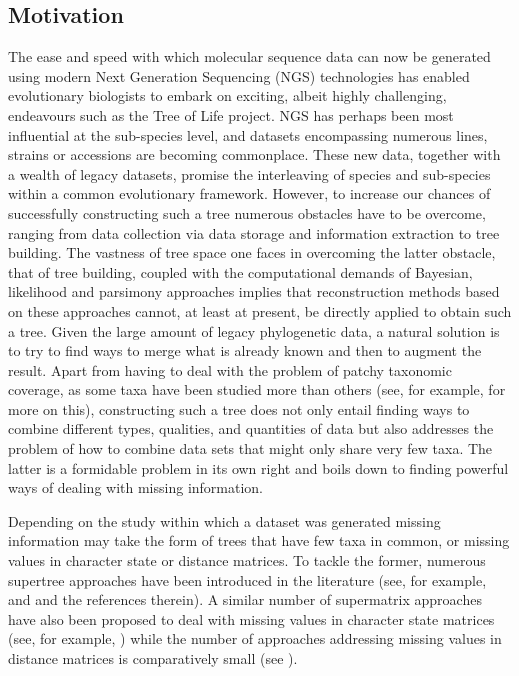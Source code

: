 \subsection{Motivation}
\label{sec:lasso-motivation}

The ease and speed with which molecular sequence data can now be generated
using modern Next Generation Sequencing (NGS) technologies has enabled
evolutionary biologists to embark on exciting, albeit highly challenging,
endeavours such as the Tree of Life project. NGS has perhaps been most
influential at the sub-species level, and datasets encompassing numerous
lines, strains or accessions are becoming commonplace. These new data,
together with a wealth of legacy datasets, promise the interleaving of species
and sub-species within a common evolutionary framework.  However, to increase
our chances of successfully constructing such a tree numerous obstacles have
to be overcome, ranging from data collection via data storage and information
extraction to tree building. The vastness of tree space one faces in
overcoming the latter obstacle, that of tree building, coupled with the
computational demands of Bayesian, likelihood and parsimony approaches implies
that reconstruction methods based on these approaches cannot, at least at
present, be directly applied to obtain such a tree. Given the large amount of
legacy phylogenetic data, a natural solution is to try to find ways to merge
what is already known and then to augment the result. Apart from having to
deal with the problem of patchy taxonomic coverage, as some taxa have been
studied more than others (see, for example,
\cite{sanderson10phylogenomics,philippe2004phylogenomics,steel10characterizing,roure12impact}
for more on this), constructing such a tree does not only entail finding ways
to combine different types, qualities, and quantities of data but also
addresses the problem of how to combine data sets that might only share very
few taxa. The latter is a formidable problem in its own right and boils down
to finding powerful ways of dealing with missing information.

Depending on the study within which a dataset was generated missing
information may take the form of trees that have few taxa in common, or
missing values in character state or distance matrices.  To tackle the former,
numerous supertree approaches have been introduced in the literature (see, for
example, \cite{bininda04phylogenetic} and \cite{brinkmeyer13flipcut} and the
references therein).  A similar number of supermatrix approaches have also
been proposed to deal with missing values in character state matrices (see,
for example, \cite{bininda04phylogenetic}) while the number of approaches
addressing missing values in distance matrices is comparatively small (see
\cite{criscuolo2006sdm,criscuolo2008fastnj,makarenkov2001nouvelle,guenoche1999approximations,guenoche2004extension,de1984ultrametric,gaul1994pyramidal}).

